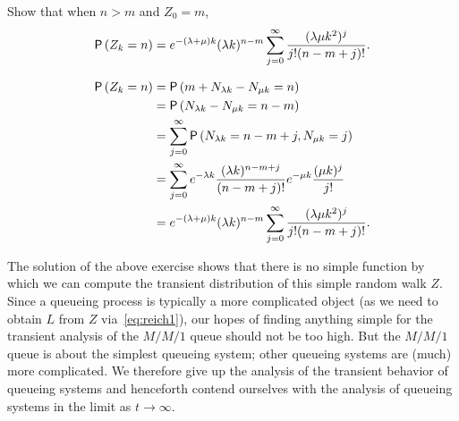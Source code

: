 \begin{exercise}
 Show that when $n>m$ and $Z_0=m$, 
\begin{equation*}
 \P{Z_k=n}
= e^{-(\lambda+\mu)k} (\lambda k)^{n-m} \sum_{j=0}^\infty 
\frac{(\lambda\mu k^2)^j} {j!(n-m+j)!}.
\end{equation*}
\begin{solution}
\begin{equation}\label{eq:29}
 \begin{split}
 \P{Z_k=n}
&= \P{m+N_{\lambda k } - N_{\mu k} = n } \\ 
&= \P{N_{\lambda k}  - N_{\mu k}  = n - m } \\
&= \sum_{j=0}^\infty \P{N_{\lambda k}  =  n - m + j, N_{\mu k} =j}\\
&= \sum_{j=0}^\infty e^{-\lambda k} \frac{(\lambda k )^{n - m + j}}{(n-m+j)!} e^{-\mu k} \frac{(\mu k )^j}{j!} \\
&= e^{-(\lambda+\mu)k} (\lambda k)^{n-m} \sum_{j=0}^\infty  \frac{(\lambda\mu k^2)^j} {j!(n-m+j)!}.
 \end{split}
\end{equation}
\end{solution}
\end{exercise}


The solution of the above exercise shows that there is no simple function by which we can compute the transient distribution of this simple random walk $Z$.
Since a queueing process is typically a more complicated object (as we need to obtain $L$ from $Z$ via~\cref{eq:reich1}), our hopes of finding anything simple for the transient analysis of the $M/M/1$ queue should not be too high.
But the $M/M/1$ queue is about the simplest queueing system; other queueing systems are (much) more complicated.
We therefore give up the analysis of the transient behavior of queueing systems and henceforth contend ourselves with the analysis of queueing systems in the limit as $t\to\infty$.





